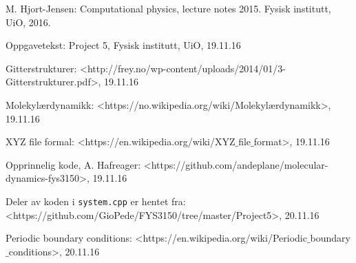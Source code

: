 \documentclass[paper=a4, fontsize=11pt]{scrartcl} %
\numberwithin{equation}{section} %
\numberwithin{figure}{section} %
\numberwithin{table}{section} %
\begin{document}

\begin{thebibliography}{9}  
    
\bibitem{}
   M. Hjort-Jensen: Computational physics, lecture notes 2015. Fysisk institutt, UiO, 2016.

\bibitem{}
   Oppgavetekst: Project 5, Fysisk institutt, UiO, 19.11.16
   
\bibitem{}
 Gitterstrukturer: <http://frey.no/wp-content/uploads/2014/01/3-Gitterstrukturer.pdf>, 19.11.16  
 
 \bibitem{}
  Molekylærdynamikk: <https://no.wikipedia.org/wiki/Molekyl$æ$rdynamikk>, 19.11.16
  
\bibitem{}
 XYZ file formal: <https://en.wikipedia.org/wiki/XYZ$\_$file$\_$format>, 19.11.16
 
 \bibitem{}
 Opprinnelig kode, A. Hafreager: <https://github.com/andeplane/molecular-dynamics-fys3150>, 19.11.16
  
\bibitem{}
  Deler av koden i \texttt{system.cpp} er hentet fra: <https://github.com/GioPede/FYS3150/tree/master/Project5>,
  20.11.16
  
 \bibitem{}
 Periodic boundary conditions: <https://en.wikipedia.org/wiki/Periodic$\_$boundary$\_$conditions>, 20.11.16

   
\end{thebibliography}
\end{document}
